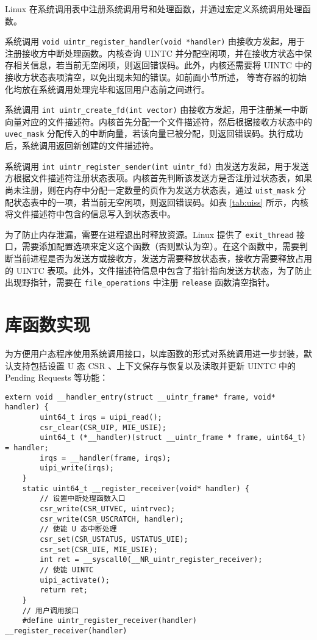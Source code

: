 Linux 在系统调用表中注册系统调用号和处理函数，并通过宏定义系统调用处理函数。

系统调用 \texttt{void uintr_register_handler(void *handler)} 由接收方发起，用于注册接收方中断处理函数。内核查询 UINTC 并分配空闲项，并在接收方状态中保存相关信息，若当前无空闲项，则返回错误码。此外，内核还需要将 UINTC 中的接收方状态表项清空，以免出现未知的错误。如前面小节所述， \Rsuirs 等寄存器的初始化均放在系统调用处理完毕和返回用户态前之间进行。

系统调用 \texttt{int uintr_create_fd(int vector)} 由接收方发起，用于注册某一中断向量对应的文件描述符。内核首先分配一个文件描述符，然后根据接收方状态中的 \texttt{uvec\_mask} 分配传入的中断向量，若该向量已被分配，则返回错误码。执行成功后，系统调用返回新创建的文件描述符。

系统调用 \texttt{int uintr_register_sender(int uintr_fd)} 由发送方发起，用于发送方根据文件描述符注册状态表项。内核首先判断该发送方是否注册过状态表，如果尚未注册，则在内存中分配一定数量的页作为发送方状态表，通过 \texttt{uist\_mask} 分配状态表中的一项，若当前无空闲项，则返回错误码。如表 \ref{tab:uiss} 所示，内核将文件描述符中包含的信息写入到状态表中。

为了防止内存泄漏，需要在进程退出时释放资源。Linux 提供了 \texttt{exit\_thread} 接口，需要添加配置选项来定义这个函数（否则默认为空）。在这个函数中，需要判断当前进程是否为发送方或接收方，发送方需要释放状态表，接收方需要释放占用的 UINTC 表项。此外，文件描述符信息中包含了指针指向发送方状态，为了防止出现野指针，需要在 \texttt{file\_operations} 中注册 \texttt{release} 函数清空指针。

\section{库函数实现}

为方便用户态程序使用系统调用接口，以库函数的形式对系统调用进一步封装，默认支持包括设置 U 态 CSR 、上下文保存与恢复以及读取并更新 UINTC 中的 Pending Requests 等功能：

\begin{lstlisting}[style=CStyle]
    extern void __handler_entry(struct __uintr_frame* frame, void* handler) {
        uint64_t irqs = uipi_read();
        csr_clear(CSR_UIP, MIE_USIE);
        uint64_t (*__handler)(struct __uintr_frame * frame, uint64_t) = handler;
        irqs = __handler(frame, irqs);
        uipi_write(irqs);
    }
    static uint64_t __register_receiver(void* handler) {
        // 设置中断处理函数入口
        csr_write(CSR_UTVEC, uintrvec);
        csr_write(CSR_USCRATCH, handler);
        // 使能 U 态中断处理
        csr_set(CSR_USTATUS, USTATUS_UIE);
        csr_set(CSR_UIE, MIE_USIE);
        int ret = __syscall0(__NR_uintr_register_receiver);
        // 使能 UINTC 
        uipi_activate();
        return ret;
    }
    // 用户调用接口
    #define uintr_register_receiver(handler) __register_receiver(handler)
\end{lstlisting}

